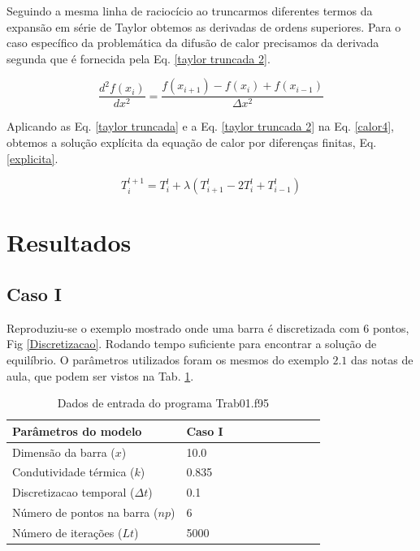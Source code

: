 \documentclass[12pt,a4paper,final]{report}%
\begin{document}
Seguindo a mesma linha de raciocício ao truncarmos diferentes termos da expansão em série de Taylor obtemos as derivadas de ordens superiores. Para o caso específico da problemática da difusão de calor precisamos da derivada segunda que é fornecida pela Eq. \ref{taylor truncada 2}. 

\begin{equation}
\frac{d^{2}f(x_{i})}{dx^{2}} = \frac{f(x_{i+1}) - f(x_{i}) + f(x_{i-1})}{\Delta x^{2}}
\label{taylor truncada 2}
\end{equation}

Aplicando as Eq. \ref{taylor truncada} e a Eq. \ref{taylor truncada 2} na Eq. \ref{calor4}, obtemos a solução explícita da equação de calor por diferenças finitas, Eq.\ref{explicita}.

\begin{equation}
T^{l+1}_{i}=T^{l}_{i}+\lambda (T^{l}_{i+1}-2T^{l}_{i}+T^{l}_{i-1})
\label{explicita}
\end{equation}


\section*{Resultados}
\subsection*{Caso I}
Reproduziu-se o exemplo mostrado onde uma barra é discretizada com $6$ pontos, Fig \ref{Discretizacao}. Rodando tempo suficiente para encontrar a solução de equilíbrio. O parâmetros utilizados foram os mesmos do exemplo $2.1$ das notas de aula, que podem ser vistos na Tab. \ref{casoI}.



\begin{table}[H]
\centering
\caption{Dados de entrada do programa Trab01.f95}
\label{casoI}
\begin{tabular}{@{}llllllllll@{}}
\toprule
Parâmetros do modelo                &   Caso I     		\\ \midrule
Dimensão da barra ($x$) 		    &   10.0     			\\
Condutividade térmica ($k$) 	    &    0.835           	\\
Discretizacao temporal ($\Delta t$) &    0.1    			\\
Número de pontos na barra ($np$)    &     6         		\\
Número de iterações ($Lt$)		    &     5000   			\\
 \bottomrule
\end{tabular}
\end{table}
\end{document}
